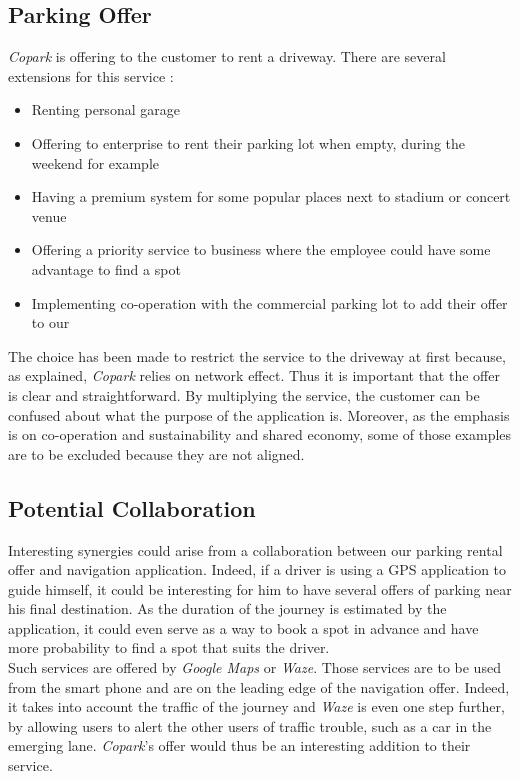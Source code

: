\documentclass[12pt,a4paper,oneside]{book}
\newcommand{\bp}{\textit{Copark}}
\begin{document}
\subsection{Parking Offer}
\bp{} is offering to the customer to rent a driveway. There are several extensions for this service :
\begin{itemize}
\item Renting personal garage
\item Offering to enterprise to rent their parking lot when empty, during the weekend for example
\item Having a premium system for some popular places next to stadium or concert venue
\item Offering a priority service to business where the employee could have some advantage to find a spot
\item Implementing co-operation with the commercial parking lot to add their offer to our
\end{itemize} 
The choice has been made to restrict the service to the driveway at first because, as explained, \bp{} relies on network effect. Thus it is important that the offer is clear and straightforward. By multiplying the service, the customer can be confused about what the purpose of the application is. Moreover, as the emphasis is on co-operation and sustainability and shared economy, some of those examples are to be excluded because they are not aligned.

\subsection{Potential Collaboration}
Interesting synergies could arise from a collaboration between our parking rental offer and navigation application. Indeed, if a driver is using a GPS application to guide himself, it could be interesting for him to have several offers of parking near his final destination. As the duration of the journey is estimated by the application, it could even serve as a way to book a spot in advance and have more probability to find a spot that suits the driver.\\

Such services are offered by \textit{Google Maps} or \textit{Waze}. Those services are to be used from the smart phone and are on the leading edge of the navigation offer. Indeed, it takes into account the traffic of the journey and \textit{Waze} is even one step further, by allowing users to alert the other users of traffic trouble, such as a car in the emerging lane. \bp{}'s offer would thus be an interesting addition to their service.\\
\end{document}
